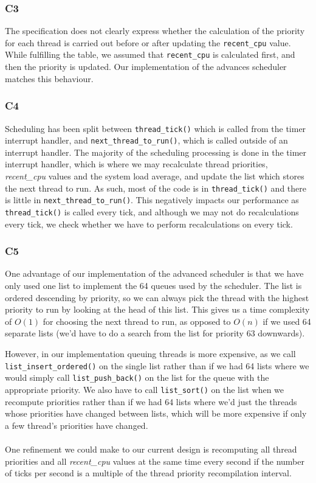 \documentclass[a4wide, 11pt]{article}
\newcommand{\tx}{\texttt}
\begin{document}
\subsubsection{C3}

The specification does not clearly express whether the calculation of the priority for each thread is carried out before or after updating the \tx{recent\_cpu} value. While fulfilling the table, we assumed that \tx{recent\_cpu} is calculated first, and then the priority is updated. Our implementation of the advances scheduler matches this behaviour.  

\subsubsection{C4}

Scheduling has been split between \texttt{thread\_tick()} which is called from the timer interrupt handler, and \texttt{next\_thread\_to\_run()}, which is called outside of an interrupt handler. The majority of the scheduling processing is done in the timer interrupt handler, which is where we may recalculate thread priorities, \textit{recent\_cpu} values and the system load average, and update the list which stores the next thread to run. As such, most of the code is in \texttt{thread\_tick()} and there is little in \texttt{next\_thread\_to\_run()}. This negatively impacts our performance as \texttt{thread\_tick()} is called every tick, and although we may not do recalculations every tick, we check whether we have to perform recalculations on every tick.

\subsubsection{C5}

One advantage of our implementation of the advanced scheduler is that we have only used one list to implement the 64 queues used by the scheduler. The list is ordered descending by priority, so we can always pick the thread with the highest priority to run by looking at the head of this list. This gives us a time complexity of $O(1)$ for choosing the next thread to run, as opposed to $O(n)$ if we used 64 separate lists (we'd have to do a search from the list for priority $63$ downwards).

However, in our implementation queuing threads is more expensive, as we call \texttt{list\_insert\_ordered()} on the single list rather than if we had 64 lists where we would simply call \texttt{list\_push\_back()} on the list for the queue with the appropriate priority. We also have to call \texttt{list\_sort()} on the list when we recompute priorities rather than if we had 64 lists where we'd just the threads whose priorities have changed between lists, which will be more expensive if only a few thread's priorities have changed.
\\ \\
One refinement we could make to our current design is recomputing all thread priorities and all \textit{recent\_cpu} values at the same time every second if the number of ticks per second is a multiple of the thread priority recompilation interval.
\end{document}
